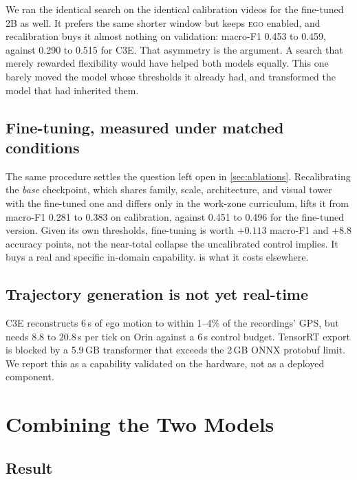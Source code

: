\documentclass[journal]{IEEEtran}
\newcommand{\st}[1]{\textsc{#1}}
\begin{document}
We ran the identical search on the identical calibration videos for the fine-tuned 2B as well.  It prefers the same shorter window but keeps \st{ego} enabled, and recalibration buys it almost nothing on validation: macro-F1 0.453 to 0.459, against 0.290 to 0.515 for C3E.  That asymmetry is the argument.  A search that merely rewarded flexibility would have helped both models equally. This one barely moved the model whose thresholds it already had, and transformed the model that had inherited them.

\subsection{Fine-tuning, measured under matched conditions}

The same procedure settles the question left open in \cref{sec:ablations}. Recalibrating the \emph{base} checkpoint, which shares family, scale, architecture, and visual tower with the fine-tuned one and differs only in the work-zone curriculum, lifts it from macro-F1 0.281 to 0.383 on calibration, against 0.451 to 0.496 for the fine-tuned version.  Given its own thresholds, fine-tuning is worth $+0.113$ macro-F1 and $+8.8$ accuracy points, not the near-total collapse the uncalibrated control implies.  It buys a real and specific in-domain capability.   is what it costs elsewhere.

\subsection{Trajectory generation is not yet real-time}
C3E reconstructs 6\,s of ego motion to within 1--4\% of the recordings' GPS, but needs 8.8 to 20.8\,s per tick on Orin against a 6\,s control budget.  TensorRT export is blocked by a 5.9\,GB transformer that exceeds the 2\,GB ONNX protobuf limit.  We report this as a capability validated on the hardware, not as a deployed component.

\section{Combining the Two Models}
\label{sec:joint}

\subsection{Result}
\end{document}
